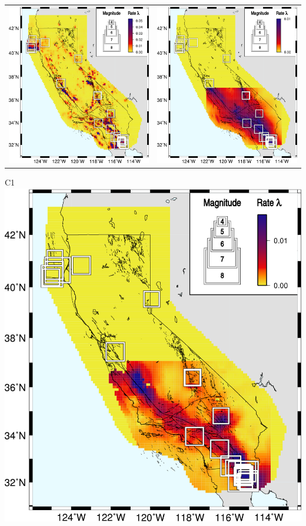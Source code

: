 \documentclass[landscape,a0paper,final,showframe]{baposter}
\begin{document}
\begin{poster}
{\begin{tabular}{cc}
	\includegraphics[height=.42\linewidth]{helm.png} & \hspace{2.5em}\includegraphics[height=.42\linewidth]{kagan.png} \\
\end{tabular}
\begin{center}
	C1  \\
	\includegraphics[height=.42\linewidth]{shen.png}  %
\end{center}
  }


\end{poster}
\end{document}
